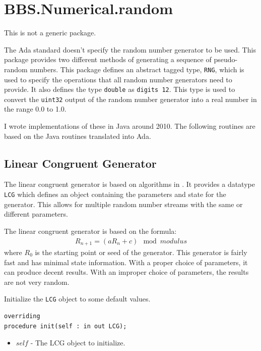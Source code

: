 \documentclass[10pt, openany]{book}
\newcommand{\indexfunc}[1]{\index[func]{#1}}
\newcommand{\datatype}[1]{\texttt{#1}}
\begin{document}
\section{BBS.Numerical.random}
This is not a generic package.

The Ada standard doesn't specify the random number generator to be used.  This package provides two different methods of generating a sequence of pseudo-random numbers.  This package defines an abstract tagged type, \datatype{RNG}, which is used to specify the operations that all random number generators need to provide.  It also defines the type \datatype{double} as \datatype{digits 12}.  This type is used to convert the \datatype{uint32} output of the random number generator into a real number in the range 0.0 to 1.0.

I wrote implementations of these in Java around 2010.  The following routines are based on the Java routines translated into Ada.

\subsection{Linear Congruent Generator}
The linear congruent generator is based on algorithms in \cite{NR-C}.  It provides a datatype \datatype{LCG} which defines an object containing the parameters and state for the generator.  This allows for multiple random number streams with the same or different parameters.

The linear congruent generator is based on the formula:
\begin{align*}
  R_{n+1} = (aR_n + c) \mod modulus
\end{align*}
where $R_0$ is the starting point or seed of the generator.  This generator is fairly fast and has minimal state information.  With a proper choice of parameters, it can produce decent results.  With an improper choice of parameters, the results are not very random.

Initialize the \datatype{LCG} object to some default values.
\begin{lstlisting}
overriding
procedure init(self : in out LCG);
\end{lstlisting}
\indexfunc{rnd-init}
\begin{itemize}
  \item $self$ - The LCG object to initialize.
\end{itemize}
\end{document}
